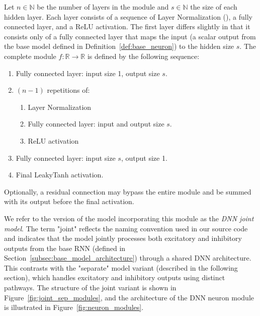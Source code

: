 \begin{defn}
    Let $n \in \mathbb{N}$ be the number of layers in the module and $s \in \mathbb{N}$ the size of each hidden layer. Each layer consists of a sequence of Layer Normalization (\citet{ba2016layernormalization}), a fully connected layer, and a ReLU activation. The first layer differs slightly in that it consists only of a fully connected layer that maps the input (a scalar output from the base model defined in Definition~\ref{def:base_neuron}) to the hidden size $s$. The complete module $f: \mathbb{R} \to \mathbb{R}$ is defined by the following sequence:
    
    \begin{enumerate}
        \item Fully connected layer: input size 1, output size $s$.
        \item $(n-1)$ repetitions of:
        \begin{enumerate}
            \item Layer Normalization
            \item Fully connected layer: input and output size $s$.
            \item ReLU activation
        \end{enumerate}
        \item Fully connected layer: input size $s$, output size 1.
        \item Final LeakyTanh activation.
    \end{enumerate}
    
    Optionally, a residual connection may bypass the entire module and be summed with its output before the final activation.
\end{defn}
\label{def:dnn_joint}

We refer to the version of the model incorporating this module as the \emph{DNN joint model}. The term "joint" reflects the naming convention used in our source code and indicates that the model jointly processes both excitatory and inhibitory outputs from the base RNN (defined in Section~\ref{subsec:base_model_architecture}) through a shared DNN architecture. This contrasts with the "separate" model variant (described in the following section), which handles excitatory and inhibitory outputs using distinct pathways.
The structure of the joint variant is shown in Figure~\ref{fig:joint_sep_modules}, and the architecture of the DNN neuron module is illustrated in Figure~\ref{fig:neuron_modules}.

